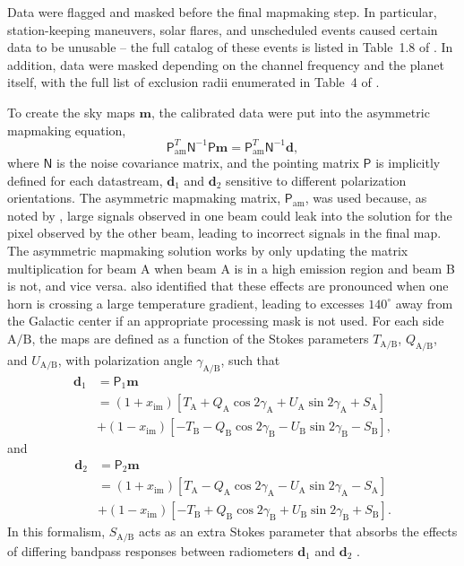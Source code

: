 \documentclass[twocolumn]{../../common/aa}
\newcommand{\A}[0]{\mathrm{A}}
\newcommand{\B}[0]{\mathrm{B}}
\begin{document}
Data were flagged and masked before the final mapmaking step. In particular, station-keeping maneuvers, solar flares, and unscheduled events caused certain data to be unusable -- the full catalog of these events is listed in Table~1.8 of \citet{wmapexsupp}. In addition, data were masked depending on the channel frequency and the planet itself, with the full list of exclusion radii enumerated in Table~4 of \citet{bennett2012}.

To create the sky maps $\boldsymbol m$, the calibrated data were put into the asymmetric mapmaking equation,
\begin{equation}
	\mathsf P_\mathrm{am}^T\mathsf N^{-1}\mathsf P\boldsymbol m=\mathsf P^T_\mathrm{am}\mathsf N^{-1}\boldsymbol d,
\end{equation}
where $\mathsf N$ is the noise covariance matrix, and the pointing matrix $\mathsf P$ is implicitly defined for each datastream, $\boldsymbol d_1$ and $\boldsymbol d_2$ sensitive to different polarization orientations. 
The asymmetric mapmaking matrix, $\mathsf P_\mathrm{am}$, was used because, as noted by \citet{jarosik2010}, large signals observed in one beam could leak into the solution for the pixel observed by the other beam, leading to incorrect signals in the final map. The asymmetric mapmaking solution works by only updating the matrix multiplication for beam A when beam A is in a high emission region and beam B is not, and vice versa. \citet{bennett2012} also identified that these effects are pronounced when one horn is crossing a large temperature gradient, leading to excesses $140^\circ$ away from the Galactic center if an appropriate processing mask is not used.
For each side $\A/\B$, the maps are defined as a function of the Stokes parameters $T_{\A/\B}$, $Q_{\A/\B}$, and $U_{\A/\B}$, with polarization angle $\gamma_{\A/\B}$, such that
\begin{align}
	\boldsymbol d_1&=\mathsf P_1\boldsymbol m
	\nonumber
	\\
	&=(1+x_\mathrm{im})[T_\A+Q_\A\cos2\gamma_\A+U_\A\sin2\gamma_\A+S_\A]
	\nonumber
	\\
	&+(1-x_\mathrm{im})[-T_\B-Q_\B\cos2\gamma_\B-U_\B\sin2\gamma_\B-S_\B],
	\label{eq:mapeq1}
\end{align}
and
\begin{align}
	\boldsymbol d_2&=\mathsf P_2\boldsymbol m
	\nonumber
	\\
	&=(1+x_\mathrm{im})[T_\A-Q_\A\cos2\gamma_\A-U_\A\sin2\gamma_\A-S_\A]
	\nonumber
	\\
	&+(1-x_\mathrm{im})[-T_\B+Q_\B\cos2\gamma_\B+U_\B\sin2\gamma_\B+S_\B].
	\label{eq:mapeq2}
\end{align}
In this formalism, $S_{\A/\B}$ acts as an extra Stokes parameter that absorbs the effects of differing bandpass responses between radiometers $\boldsymbol d_1$ and $\boldsymbol d_2$ \citep{jarosik2007}.
\end{document}
